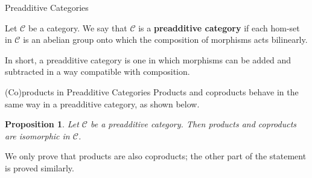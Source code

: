 \documentclass{beamer}
\newtheorem{proposition}{Proposition}
\begin{document}
\begin{frame}{Preadditive Categories}
    \begin{definition}
        Let $\mathcal{C}$ be a category. We say that $\mathcal{C}$
        is a \textbf{preadditive category} if each hom-set in
        $\mathcal{C}$ is an abelian group onto which the composition of
        morphisms acts bilinearly.
    \end{definition}

    In short, a preadditive category is one in which morphisms can
    be added and subtracted in a way compatible with composition.
\end{frame}

\begin{frame}{(Co)products in Preadditive Categories}
    Products and coproducts behave in the same way in a
    preadditive category, as shown below. \smallskip

    \begin{proposition}
        Let $\mathcal{C}$ be a preadditive category. Then
        products and coproducts are isomorphic
        in $\mathcal{C}$.
    \end{proposition}

    We only prove that products are also coproducts; the other part of
    the statement is proved similarly.
\end{frame}
\end{document}
